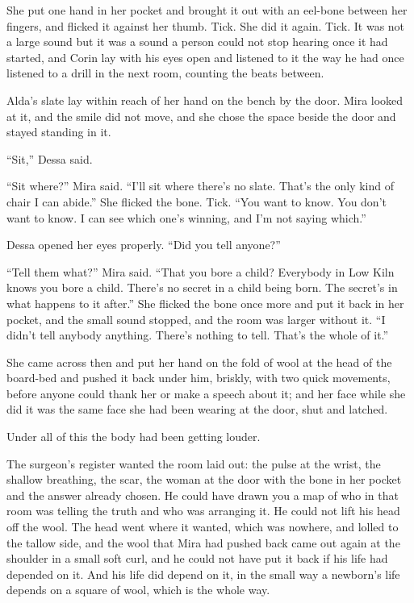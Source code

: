 She put one hand in her pocket and brought it out with an eel-bone between her fingers, and flicked it against her thumb. Tick. She did it again. Tick. It was not a large sound but it was a sound a person could not stop hearing once it had started, and Corin lay with his eyes open and listened to it the way he had once listened to a drill in the next room, counting the beats between.

Alda's slate lay within reach of her hand on the bench by the door. Mira looked at it, and the smile did not move, and she chose the space beside the door and stayed standing in it.

“Sit,” Dessa said.

“Sit where?” Mira said. “I'll sit where there's no slate. That's the only kind of chair I can abide.” She flicked the bone. Tick. “You want to know. You don't want to know. I can see which one's winning, and I'm not saying which.”

Dessa opened her eyes properly. “Did you tell anyone?”

“Tell them what?” Mira said. “That you bore a child? Everybody in Low Kiln knows you bore a child. There's no secret in a child being born. The secret's in what happens to it after.” She flicked the bone once more and put it back in her pocket, and the small sound stopped, and the room was larger without it. “I didn't tell anybody anything. There's nothing to tell. That's the whole of it.”

She came across then and put her hand on the fold of wool at the head of the board-bed and pushed it back under him, briskly, with two quick movements, before anyone could thank her or make a speech about it; and her face while she did it was the same face she had been wearing at the door, shut and latched.

Under all of this the body had been getting louder.

The surgeon's register wanted the room laid out: the pulse at the wrist, the shallow breathing, the scar, the woman at the door with the bone in her pocket and the answer already chosen. He could have drawn you a map of who in that room was telling the truth and who was arranging it. He could not lift his head off the wool. The head went where it wanted, which was nowhere, and lolled to the tallow side, and the wool that Mira had pushed back came out again at the shoulder in a small soft curl, and he could not have put it back if his life had depended on it. And his life did depend on it, in the small way a newborn's life depends on a square of wool, which is the whole way.

